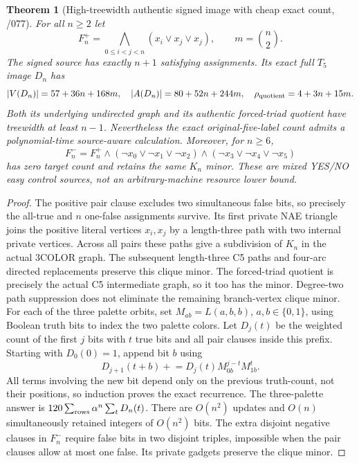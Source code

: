 \documentclass[11pt]{article}
\newtheorem{theorem}{Theorem}
\begin{document}
\begin{theorem}[High-treewidth authentic signed image with cheap exact count, /077]
For all $n\ge2$ let
\[
 F_n^+=\bigwedge_{0\le i<j<n}(x_i\lor x_j\lor x_j),
 \qquad m={n\choose2}.
\]
The signed source has exactly $n+1$ satisfying assignments.
Its exact full $T_5$ image $D_n$ has
\[
 |V(D_n)|=57+36n+168m,\quad
 |A(D_n)|=80+52n+244m,
\quad \rho_{\rm quotient}=4+3n+15m.
\]
Both its underlying undirected graph and its authentic
forced-triad quotient have treewidth at least $n-1$.
Nevertheless the exact original-five-label count admits a
polynomial-time source-aware calculation. Moreover, for $n\ge6$,
\[
 F_n^-=F_n^+\wedge
 (\neg x_0\lor\neg x_1\lor\neg x_2)
 \wedge(\neg x_3\lor\neg x_4\lor\neg x_5)
\]
has zero target count and retains the same $K_n$ minor.
These are mixed YES/NO easy \emph{control} sources, not
an arbitrary-machine resource lower bound.
\end{theorem}
\begin{proof}
The positive pair clause excludes two simultaneous false bits,
so precisely the all-true and $n$ one-false assignments survive.
Its first private NAE triangle joins the positive literal vertices
$x_i,x_j$ by a length-three path with two internal private vertices.
Across all pairs these paths give a subdivision of $K_n$ in
the actual 3COLOR graph. The subsequent length-three C5 paths
and four-arc directed replacements preserve this clique minor.
The forced-triad quotient is precisely the actual C5 intermediate
graph, so it too has the minor. Degree-two path suppression does
not eliminate the remaining branch-vertex clique minor.
For each of the three palette orbits, set
$M_{ab}=L(a,b,b)$, $a,b\in\{0,1\}$, using Boolean truth bits
to index the two palette colors. Let $D_j(t)$ be the weighted
count of the first $j$ bits with $t$ true bits and all pair
clauses inside this prefix. Starting with $D_0(0)=1$, append bit
$b$ using
\[
 D_{j+1}(t+b)\mathrel{+}=
 D_j(t)M_{0b}^{j-t}M_{1b}^{t}.
\]
All terms involving the new bit depend only on the previous
truth-count, not their positions, so induction proves the exact
recurrence. The three-palette answer is
$120\sum_{\rm rows}\alpha^n\sum_tD_n(t)$.
There are $O(n^2)$ updates and $O(n)$ simultaneously retained
integers of $O(n^2)$ bits. The extra disjoint negative clauses in
$F_n^-$ require false bits in two disjoint triples, impossible
when the pair clauses allow at most one false. Its private
gadgets preserve the clique minor.
\end{proof}
\end{document}
